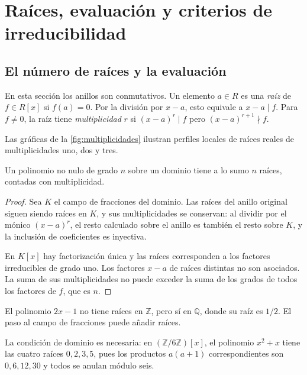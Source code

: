 \section{Raíces, evaluación y criterios de irreducibilidad}\label{sec:anillos-irreducibilidad}

\subsection{El número de raíces y la evaluación}\label{tema:19-1-1}
En esta sección los anillos son conmutativos. Un elemento $a\in R$ es una \emph{raíz} de $f\in R[x]$ si $f(a)=0$. Por la división por $x-a$, esto equivale a $x-a\mid f$. Para $f\ne0$, la raíz tiene \emph{multiplicidad} $r$ si $(x-a)^r\mid f$ pero $(x-a)^{r+1}\nmid f$.

Las gráficas de la \cref{fig:multiplicidades} ilustran perfiles locales de raíces reales de multiplicidades uno, dos y tres.

\begin{lema}\label{lema:C19-numero-raices}
Un polinomio no nulo de grado $n$ sobre un dominio tiene a lo sumo $n$ raíces, contadas con multiplicidad.
\end{lema}
\begin{proof}
Sea $K$ el campo de fracciones del dominio. Las raíces del anillo original siguen siendo raíces en $K$, y sus multiplicidades se conservan: al dividir por el mónico $(x-a)^r$, el resto calculado sobre el anillo es también el resto sobre $K$, y la inclusión de coeficientes es inyectiva.

En $K[x]$ hay factorización única y las raíces corresponden a los factores irreducibles de grado uno. Los factores $x-a$ de raíces distintas no son asociados. La suma de sus multiplicidades no puede exceder la suma de los grados de todos los factores de $f$, que es $n$.
\end{proof}
\begin{ejem}
El polinomio $2x-1$ no tiene raíces en $\mathbb Z$, pero sí en $\mathbb Q$, donde su raíz es $1/2$. El paso al campo de fracciones puede añadir raíces.

La condición de dominio es necesaria: en $(\mathbb Z/6\mathbb Z)[x]$, el polinomio $x^2+x$ tiene las cuatro raíces $0,2,3,5$, pues los productos $a(a+1)$ correspondientes son $0,6,12,30$ y todos se anulan módulo seis.
\end{ejem}

